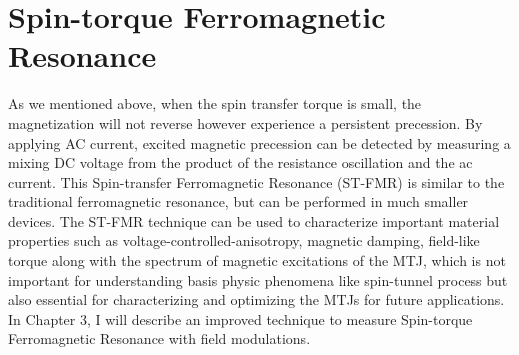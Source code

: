\section{Spin-torque Ferromagnetic Resonance}

As we mentioned above, when the spin transfer torque is small, the magnetization will not reverse however experience a persistent precession. By applying AC current, excited magnetic precession can be detected by measuring a mixing DC voltage from the product of the resistance oscillation and the ac current. This Spin-transfer Ferromagnetic Resonance (ST-FMR) \cite{Sankey2006}\cite{Tulapurkar2005} is similar to the traditional ferromagnetic resonance, but can be performed in much smaller devices. The ST-FMR technique can be used to characterize important material properties such as voltage-controlled-anisotropy\cite{VCMA1}\cite{Jian}\cite{Wang2012}, magnetic damping\cite{PRLdamping}, field-like torque\cite{Sankey2008} along with the spectrum of magnetic excitations of the MTJ\cite{excitation1}\cite{excitation2}, which is not important for understanding basis physic phenomena like spin-tunnel process but also essential for characterizing and optimizing the MTJs for future applications. In Chapter 3, I will describe an improved technique to measure Spin-torque Ferromagnetic Resonance with field modulations.








